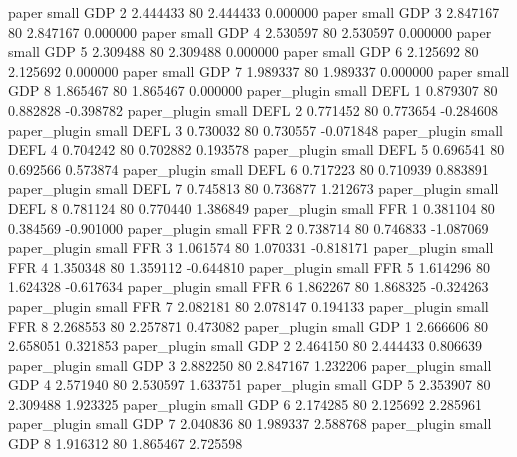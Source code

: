          paper      small      GDP                 2 2.444433 80       2.444433           0.000000
         paper      small      GDP                 3 2.847167 80       2.847167           0.000000
         paper      small      GDP                 4 2.530597 80       2.530597           0.000000
         paper      small      GDP                 5 2.309488 80       2.309488           0.000000
         paper      small      GDP                 6 2.125692 80       2.125692           0.000000
         paper      small      GDP                 7 1.989337 80       1.989337           0.000000
         paper      small      GDP                 8 1.865467 80       1.865467           0.000000
  paper_plugin      small     DEFL                 1 0.879307 80       0.882828          -0.398782
  paper_plugin      small     DEFL                 2 0.771452 80       0.773654          -0.284608
  paper_plugin      small     DEFL                 3 0.730032 80       0.730557          -0.071848
  paper_plugin      small     DEFL                 4 0.704242 80       0.702882           0.193578
  paper_plugin      small     DEFL                 5 0.696541 80       0.692566           0.573874
  paper_plugin      small     DEFL                 6 0.717223 80       0.710939           0.883891
  paper_plugin      small     DEFL                 7 0.745813 80       0.736877           1.212673
  paper_plugin      small     DEFL                 8 0.781124 80       0.770440           1.386849
  paper_plugin      small      FFR                 1 0.381104 80       0.384569          -0.901000
  paper_plugin      small      FFR                 2 0.738714 80       0.746833          -1.087069
  paper_plugin      small      FFR                 3 1.061574 80       1.070331          -0.818171
  paper_plugin      small      FFR                 4 1.350348 80       1.359112          -0.644810
  paper_plugin      small      FFR                 5 1.614296 80       1.624328          -0.617634
  paper_plugin      small      FFR                 6 1.862267 80       1.868325          -0.324263
  paper_plugin      small      FFR                 7 2.082181 80       2.078147           0.194133
  paper_plugin      small      FFR                 8 2.268553 80       2.257871           0.473082
  paper_plugin      small      GDP                 1 2.666606 80       2.658051           0.321853
  paper_plugin      small      GDP                 2 2.464150 80       2.444433           0.806639
  paper_plugin      small      GDP                 3 2.882250 80       2.847167           1.232206
  paper_plugin      small      GDP                 4 2.571940 80       2.530597           1.633751
  paper_plugin      small      GDP                 5 2.353907 80       2.309488           1.923325
  paper_plugin      small      GDP                 6 2.174285 80       2.125692           2.285961
  paper_plugin      small      GDP                 7 2.040836 80       1.989337           2.588768
  paper_plugin      small      GDP                 8 1.916312 80       1.865467           2.725598